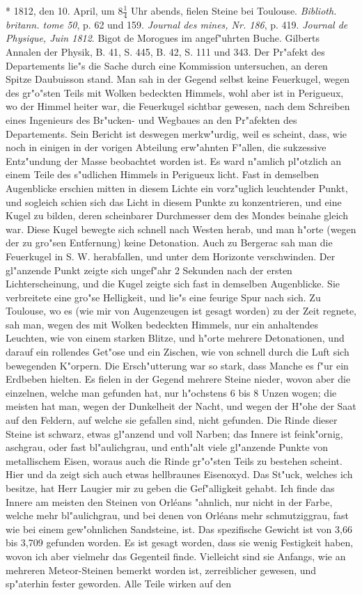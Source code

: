 \documentclass[a4paper, 11pt, oneside, polutonikogreek, german]{article}
\begin{document}
* 1812, den 10. April, um $\mathfrak{8\frac{1}{4}}$ Uhr abends, fielen Steine bei Toulouse. \emph{Biblioth. britann. tome 50}, p. 62 und 159. \emph{Journal des mines, Nr. 186}, p. 419. \emph{Journal de Physique, Juin 1812}. Bigot de Morogues im angef"uhrten Buche. Gilberts Annalen der Physik, B. 41, S. 445, B. 42, S. 111 und 343. Der Pr"afekt des Departements lie"s die Sache durch eine Kommission untersuchen, an deren Spitze Daubuisson stand. Man sah in der Gegend selbst keine Feuerkugel, wegen des gr"o"sten Teils mit Wolken bedeckten Himmels, wohl aber ist in Perigueux, wo der Himmel heiter war, die Feuerkugel sichtbar gewesen, nach dem Schreiben eines Ingenieurs des Br"ucken- und Wegbaues an den Pr"afekten des Departements. Sein Bericht ist deswegen merkw"urdig, weil es scheint, dass, wie noch in einigen in der vorigen Abteilung erw"ahnten F"allen, die sukzessive Entz"undung der Masse beobachtet worden ist. Es ward n"amlich pl"otzlich an einem Teile des s"udlichen Himmels in Perigueux licht. Fast in demselben Augenblicke erschien mitten in diesem Lichte ein vorz"uglich leuchtender Punkt, und sogleich schien sich das Licht in diesem Punkte zu konzentrieren, und eine Kugel zu bilden, deren scheinbarer Durchmesser dem des Mondes beinahe gleich war. Diese Kugel bewegte sich schnell nach Westen herab, und man h"orte (wegen der zu gro"sen Entfernung) keine Detonation. Auch zu Bergerac sah man die Feuerkugel in S. W. herabfallen, und unter dem Horizonte verschwinden. Der gl"anzende Punkt zeigte sich ungef"ahr 2 Sekunden nach der ersten Lichterscheinung, und die Kugel zeigte sich fast in demselben Augenblicke. Sie verbreitete eine gro"se Helligkeit, und lie"s eine feurige Spur nach sich. Zu Toulouse, wo es (wie mir von Augenzeugen ist gesagt worden) zu der Zeit regnete, sah man, wegen des mit Wolken bedeckten Himmels, nur ein anhaltendes Leuchten, wie von einem starken Blitze, und h"orte mehrere Detonationen, und darauf ein rollendes Get"ose und ein Zischen, wie von schnell durch die Luft sich bewegenden K"orpern. Die Ersch"utterung war so stark, dass Manche es f"ur ein Erdbeben hielten. Es fielen in der Gegend mehrere Steine nieder, wovon aber die einzelnen, welche man gefunden hat, nur h"ochstens 6 bis 8 Unzen wogen; die meisten hat man, wegen der Dunkelheit der Nacht, und wegen der H"ohe der Saat auf den Feldern, auf welche sie gefallen sind, nicht gefunden. Die Rinde dieser Steine ist schwarz, etwas gl"anzend und voll Narben; das Innere ist feink"ornig, aschgrau, oder fast bl"aulichgrau, und enth"alt viele gl"anzende Punkte von metallischem Eisen, woraus auch die Rinde gr"o"sten Teils zu bestehen scheint. Hier und da zeigt sich auch etwas hellbraunes Eisenoxyd. Das St"uck, welches ich besitze, hat Herr Laugier mir zu geben die Gef"alligkeit gehabt. Ich finde das Innere am meisten den Steinen von Orléans "ahnlich, nur nicht in der Farbe, welche mehr bl"aulichgrau, und bei denen von Orléans mehr schmutziggrau, fast wie bei einem gew"ohnlichen Sandsteine, ist. Das spezifische Gewicht ist von 3,66 bis 3,709 gefunden worden. Es ist gesagt worden, dass sie wenig Festigkeit haben, wovon ich aber vielmehr das Gegenteil finde. Vielleicht sind sie Anfangs, wie an mehreren Meteor-Steinen bemerkt worden ist, zerreiblicher gewesen, und sp"aterhin fester geworden. Alle Teile wirken auf den 
\end{document}
